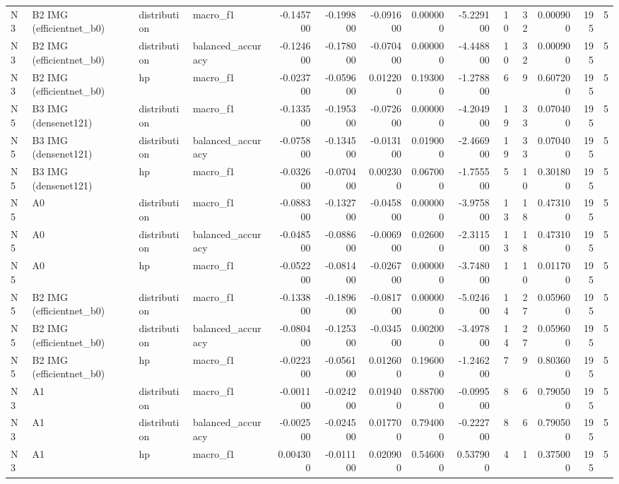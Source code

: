 \begin{table}
\begin{tabular}{llllrrrrrrrrrr}
N3 & B2 IMG (efficientnet\_b0) & distribution & macro\_f1 & -0.145700 & -0.199800 & -0.091600 & 0.000000 & -5.229100 & 10 & 32 & 0.000900 & 195 & 5 \\
N3 & B2 IMG (efficientnet\_b0) & distribution & balanced\_accuracy & -0.124600 & -0.178000 & -0.070400 & 0.000000 & -4.448800 & 10 & 32 & 0.000900 & 195 & 5 \\
N3 & B2 IMG (efficientnet\_b0) & hp & macro\_f1 & -0.023700 & -0.059600 & 0.012200 & 0.193000 & -1.278800 & 6 & 9 & 0.607200 & 195 & 5 \\
N5 & B3 IMG (densenet121) & distribution & macro\_f1 & -0.133500 & -0.195300 & -0.072600 & 0.000000 & -4.204900 & 19 & 33 & 0.070400 & 195 & 5 \\
N5 & B3 IMG (densenet121) & distribution & balanced\_accuracy & -0.075800 & -0.134500 & -0.013100 & 0.019000 & -2.466900 & 19 & 33 & 0.070400 & 195 & 5 \\
N5 & B3 IMG (densenet121) & hp & macro\_f1 & -0.032600 & -0.070400 & 0.002300 & 0.067000 & -1.755500 & 5 & 10 & 0.301800 & 195 & 5 \\
N5 & A0 & distribution & macro\_f1 & -0.088300 & -0.132700 & -0.045800 & 0.000000 & -3.975800 & 13 & 18 & 0.473100 & 195 & 5 \\
N5 & A0 & distribution & balanced\_accuracy & -0.048500 & -0.088600 & -0.006900 & 0.026000 & -2.311500 & 13 & 18 & 0.473100 & 195 & 5 \\
N5 & A0 & hp & macro\_f1 & -0.052200 & -0.081400 & -0.026700 & 0.000000 & -3.748000 & 1 & 10 & 0.011700 & 195 & 5 \\
N5 & B2 IMG (efficientnet\_b0) & distribution & macro\_f1 & -0.133800 & -0.189600 & -0.081700 & 0.000000 & -5.024600 & 14 & 27 & 0.059600 & 195 & 5 \\
N5 & B2 IMG (efficientnet\_b0) & distribution & balanced\_accuracy & -0.080400 & -0.125300 & -0.034500 & 0.002000 & -3.497800 & 14 & 27 & 0.059600 & 195 & 5 \\
N5 & B2 IMG (efficientnet\_b0) & hp & macro\_f1 & -0.022300 & -0.056100 & 0.012600 & 0.196000 & -1.246200 & 7 & 9 & 0.803600 & 195 & 5 \\
N3 & A1 & distribution & macro\_f1 & -0.001100 & -0.024200 & 0.019400 & 0.887000 & -0.099500 & 8 & 6 & 0.790500 & 195 & 5 \\
N3 & A1 & distribution & balanced\_accuracy & -0.002500 & -0.024500 & 0.017700 & 0.794000 & -0.222700 & 8 & 6 & 0.790500 & 195 & 5 \\
N3 & A1 & hp & macro\_f1 & 0.004300 & -0.011100 & 0.020900 & 0.546000 & 0.537900 & 4 & 1 & 0.375000 & 195 & 5 \\

\end{tabular}
\end{table}
